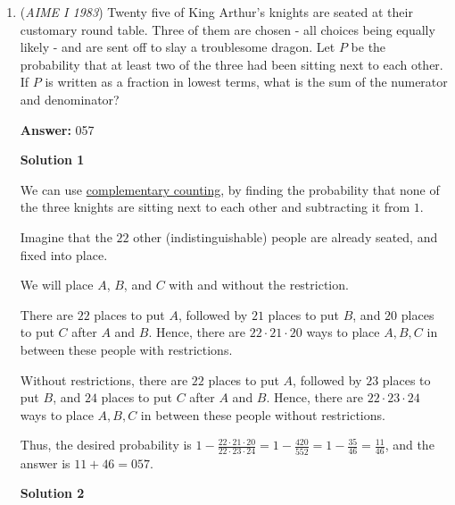 \begin{enumerate}
\textbf{Solution 4 last resort (bash)}

Repeat the steps of taking modulo $49$ after reducing the exponents over and over again until you get a residue of $49,$ namely $35.$ This bashing takes a lot of time but it isn’t too bad. ~peelybonehead

 Note: the problem where this is linked is covered 1:00-2:00

 


	\item (\textit{AIME I 1983}) Twenty five of King Arthur's knights are seated at their customary round table. Three of them are chosen - all choices being equally likely - and are sent off to slay a troublesome dragon. Let $P$ be the probability that at least two of the three had been sitting next to each other. If $P$ is written as a fraction in lowest terms, what is the sum of the numerator and denominator?


 
 \textbf{Answer: }057



\textbf{Solution 1}

We can use \href{https://artofproblemsolving.com/wiki/index.php?title=Complementary\_counting}{complementary counting}, by finding the probability that none of the three knights are sitting next to each other and subtracting it from $1$.

 Imagine that the $22$ other (indistinguishable) people are already seated, and fixed into place. 

 We will place $A$, $B$, and $C$ with and without the restriction.

 There are $22$ places to put $A$, followed by $21$ places to put $B$, and $20$ places to put $C$ after $A$ and $B$. Hence, there are $22\cdot21\cdot20$ ways to place $A, B, C$ in between these people with restrictions.

 Without restrictions, there are $22$ places to put $A$, followed by $23$ places to put $B$, and $24$ places to put $C$ after $A$ and $B$. Hence, there are $22\cdot23\cdot24$ ways to place $A,B,C$ in between these people without restrictions.

 Thus, the desired probability is $1-\frac{22\cdot21\cdot20}{22\cdot23\cdot24}=1-\frac{420}{552}=1-\frac{35}{46}=\frac{11}{46}$, and the answer is $11+46=\boxed{057}$.

 



\textbf{Solution 2}


\end{enumerate}

